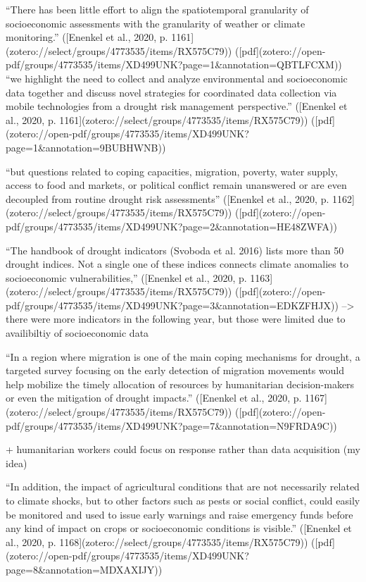 {“There has been little effort to align the spatiotemporal granularity of socioeconomic assessments with the granularity of weather or climate monitoring.” ([Enenkel et al., 2020, p. 1161](zotero://select/groups/4773535/items/RX575C79)) ([pdf](zotero://open-pdf/groups/4773535/items/XD499UNK?page=1&annotation=QBTLFCXM))
“we highlight the need to collect and analyze environmental and socioeconomic data together and discuss novel strategies for coordinated data collection via mobile technologies from a drought risk management perspective.” ([Enenkel et al., 2020, p. 1161](zotero://select/groups/4773535/items/RX575C79)) ([pdf](zotero://open-pdf/groups/4773535/items/XD499UNK?page=1&annotation=9BUBHWNB))

“but questions related to coping capacities, migration, poverty, water supply, access to food and markets, or political conflict remain unanswered or are even decoupled from routine drought risk assessments” ([Enenkel et al., 2020, p. 1162](zotero://select/groups/4773535/items/RX575C79)) ([pdf](zotero://open-pdf/groups/4773535/items/XD499UNK?page=2&annotation=HE48ZWFA))

“The handbook of drought indicators (Svoboda et al. 2016) lists more than 50 drought indices. Not a single one of these indices connects climate anomalies to socioeconomic vulnerabilities,” ([Enenkel et al., 2020, p. 1163](zotero://select/groups/4773535/items/RX575C79)) ([pdf](zotero://open-pdf/groups/4773535/items/XD499UNK?page=3&annotation=EDKZFHJX))
--> there were more indicators in the following year, but those were limited due to availibiltiy of socioeconomic data

“In a region where migration is one of the main coping mechanisms for drought, a targeted survey focusing on the early detection of migration movements would help mobilize the timely allocation of resources by humanitarian decision-makers or even the mitigation of drought impacts.” ([Enenkel et al., 2020, p. 1167](zotero://select/groups/4773535/items/RX575C79)) ([pdf](zotero://open-pdf/groups/4773535/items/XD499UNK?page=7&annotation=N9FRDA9C))

+ humanitarian workers could focus on response rather than data acquisition (my idea)

“In addition, the impact of agricultural conditions that are not necessarily related to climate shocks, but to other factors such as pests or social conflict, could easily be monitored and used to issue early warnings and raise emergency funds before any kind of impact on crops or socioeconomic conditions is visible.” ([Enenkel et al., 2020, p. 1168](zotero://select/groups/4773535/items/RX575C79)) ([pdf](zotero://open-pdf/groups/4773535/items/XD499UNK?page=8&annotation=MDXAXIJY))

}
